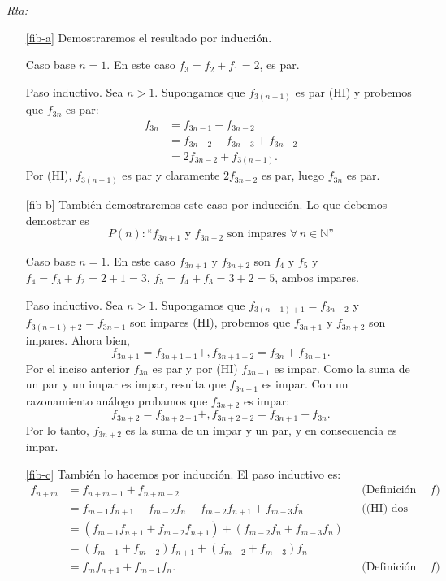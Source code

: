 \documentclass[a4paper,12pt,twoside,spanish,reqno]{amsbook}
\numberwithin{equation}{section}
\newcommand{\rta}{\noindent\textit{Rta: }}
\begin{document}
\begin{enumerate}
\rta 
\begin{enumerate}
    \item[\ref{fib-a}] Demostraremos el resultado por inducción. 

    Caso base $n=1$. En este caso $f_3 = f_2 + f_1 = 2$, es par.
    
    Paso inductivo. Sea $n>1$. Supongamos que $f_{3(n-1)}$ es par (HI) y probemos que $f_{3n}$ es par: 
    \begin{align*}
        f_{3n} & = f_{3n-1} + f_{3n-2} \\
               & = f_{3n-2} + f_{3n-3} + f_{3n-2} \\
               & = 2 f_{3n-2} + f_{3(n-1)}. 
    \end{align*}
    Por (HI), $f_{3(n-1)}$ es par  y claramente $ 2 f_{3n-2}$  es par, luego $f_{3n}$ es par.
    \item[\ref{fib-b}] También demostraremos este caso por inducción. Lo que debemos demostrar es 
    $$
    P(n) : \text{``$f_{3n+1}$ y $f_{3n+2}$ son impares $\forall\, n\in\mathbb N$''}
    $$
    
    Caso base $n=1$. En este caso $f_{3n+1}$ y $f_{3n+2}$ son $f_{4}$ y $f_{5}$ y $f_4 = f_3+f_2 = 2 +1 =3$, $f_5 = f_4 +f_3 =3 +2 =5$, ambos impares. 
    
    Paso  inductivo.  Sea $n>1$. Supongamos que $f_{3(n-1)+1} = f_{3n-2}$ y $f_{3(n-1)+2} = f_{3n-1}$ son impares (HI), probemos que  $f_{3n+1}$ y $f_{3n+2}$ son impares. 
    Ahora bien, 
    $$
    f_{3n+1} = f_{3n+1 -1} + ,f_{3n+1 -2} =f_{3n} + f_{3n-1}.
    $$
    Por el inciso anterior $f_{3n}$  es par y por (HI) $f_{3n-1}$ es impar. Como la suma de un par y un impar es impar, resulta que $f_{3n+1}$ es impar. Con un razonamiento análogo probamos que $f_{3n+2}$  es impar:  
    $$
    f_{3n+2} = f_{3n+2 -1} + ,f_{3n+2 -2} =f_{3n +1} + f_{3n}.
    $$
    Por lo tanto, $f_{3n+2}$  es la suma de un impar y un par, y en consecuencia es impar. 
    
    \item[\ref{fib-c}] También lo hacemos por inducción. El paso inductivo es:
    \begin{align*}
        f_{n+m} &= f_{n+m -1} +f_{n+m-2}&&\text{(Definición recursiva de $f$)} \\
                &= f_{m-1}f_{n+1}+f_{m-2}f_{n}  + f_{m-2}f_{n+1}+f_{m-3}f_{n}&&\text{((HI) dos veces)} \\
                &= (f_{m-1}f_{n+1}  + f_{m-2}f_{n+1})+(f_{m-2}f_{n}+f_{m-3}f_{n})&& \\
                &= (f_{m-1} + f_{m-2})f_{n+1}+(f_{m-2}+f_{m-3})f_{n}&& \\
                &= f_{m}f_{n+1}+f_{m-1}f_{n}.&&\text{(Definición recursiva de $f$)}
    \end{align*}
    

\end{enumerate}
\end{enumerate}
\end{document}
